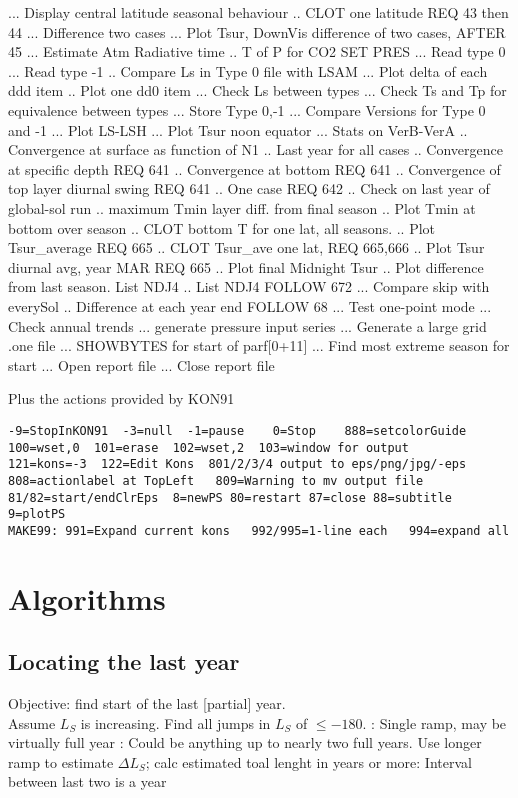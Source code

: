 \documentclass{article}  %
\begin{document}
\qi {}... Display central latitude seasonal behaviour
\qi {}.. CLOT one latitude REQ 43 then 44
\qi {}... Difference two cases
\qi {}... Plot Tsur, DownVis difference of two cases, AFTER 45 
\qi {}... Estimate Atm Radiative time
\qi {}.. T of P for CO2 SET PRES
\qi {}... Read type 0
\qi {}... Read type -1
\qi {}.. Compare Ls in Type 0 file with LSAM 
\qi {}... Plot delta of each ddd item
\qi {}.. Plot one dd0 item
\qi {}... Check Ls between types
\qi {}... Check Ts and Tp for equivalence between types
\qi {}... Store Type 0,-1
\qi {}... Compare Versions for Type 0 and -1
\qi {}... Plot LS-LSH
\qi {}... Plot Tsur noon equator
\qi {}... Stats on VerB-VerA
\qi {}..  Convergence at surface as function of N1
\qi {}.. Last year for all cases
\qi {}.. Convergence at specific depth REQ 641
\qi {}.. Convergence at bottom REQ 641
\qi {}.. Convergence of top layer diurnal swing REQ 641
\qi {}.. One case REQ 642 
\qi {}.. Check on last year of global-sol run
\qi {}.. maximum Tmin layer diff. from final season
\qi {}.. Plot Tmin at bottom over season
\qi {}.. CLOT bottom T for one lat, all seasons.
\qi {}.. Plot Tsur\_average REQ 665
\qi {}.. CLOT Tsur\_ave one lat, REQ 665,666
\qi {}.. Plot Tsur diurnal avg, year MAR REQ 665
\qi {}.. Plot final Midnight Tsur
\qi {}.. Plot difference from last season. List NDJ4
\qi {}.. List NDJ4  FOLLOW 672
\qi {}... Compare skip with everySol 
\qi {}.. Difference at each year end FOLLOW 68
\qi {}... Test one-point mode
\qi {}... Check annual trends
\qi {}... generate pressure input series
\qi {}... Generate a large grid .one file
\qi {}... SHOWBYTES for start of parf[0+11]
\qi {}... Find most extreme season for start
\qi {}... Open report file
\qi {}... Close report file 

Plus the actions provided by KON91
\vspace{-3.mm} 
\begin{verbatim}
-9=StopInKON91  -3=null  -1=pause    0=Stop    888=setcolorGuide
100=wset,0  101=erase  102=wset,2  103=window for output
121=kons=-3  122=Edit Kons  801/2/3/4 output to eps/png/jpg/-eps
808=actionlabel at TopLeft   809=Warning to mv output file
81/82=start/endClrEps  8=newPS 80=restart 87=close 88=subtitle 9=plotPS
MAKE99: 991=Expand current kons   992/995=1-line each   994=expand all
\end{verbatim}
\section{Algorithms} %
\subsection{Locating the last year} %
Objective: find start of the last [partial] year.
\\ Assume $L_S$ is increasing. Find all jumps in $L_S$ of $\le -180$. 
: Single ramp, may be virtually full year
: Could be anything up to nearly two full years.
\qii Use longer ramp to estimate $ \Delta L_S$; calc estimated toal lenght in years
 or more: Interval between last two is a year 
\end{document}
